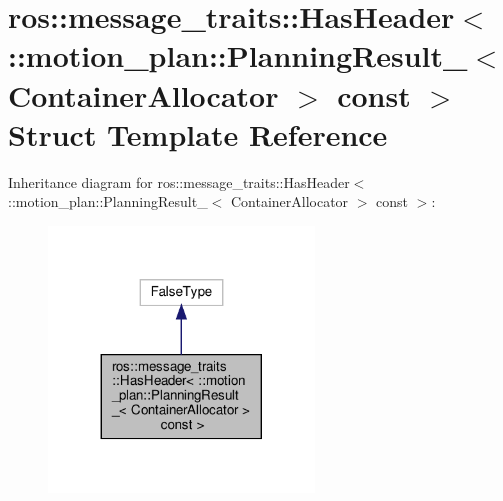 \hypertarget{structros_1_1message__traits_1_1HasHeader_3_01_1_1motion__plan_1_1PlanningResult___3_01ContainerAllocator_01_4_01const_01_4}{}\section{ros\+:\+:message\+\_\+traits\+:\+:Has\+Header$<$ \+:\+:motion\+\_\+plan\+:\+:Planning\+Result\+\_\+$<$ Container\+Allocator $>$ const $>$ Struct Template Reference}
\label{structros_1_1message__traits_1_1HasHeader_3_01_1_1motion__plan_1_1PlanningResult___3_01ContainerAllocator_01_4_01const_01_4}


Inheritance diagram for ros\+:\+:message\+\_\+traits\+:\+:Has\+Header$<$ \+:\+:motion\+\_\+plan\+:\+:Planning\+Result\+\_\+$<$ Container\+Allocator $>$ const $>$\+:
\nopagebreak
\begin{figure}[H]
\begin{center}
\leavevmode
\includegraphics[width=200pt]{structros_1_1message__traits_1_1HasHeader_3_01_1_1motion__plan_1_1PlanningResult___3_01Containerb054651992d63dc125e652772fef54c7}
\end{center}
\end{figure}


